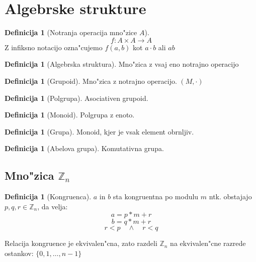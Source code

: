 \documentclass[11pt, a4paper]{article}
\theoremstyle{definition}
\newtheorem{defn}[counter]{Definicija}
\theoremstyle{remark}
\newcommand{\Z}{\mathbb{Z}}
\begin{document}
	\section{Algebrske strukture}
	\begin{defn}[Notranja operacija mno"zice $A$]
		\[ f: A \times A \rightarrow A\]
		Z infiksno notacijo ozna"cujemo $f(a,b)$ kot $a \cdot b$ ali $ab$
	\end{defn}
	\begin{defn}[Algebrska struktura]
		Mno"zica z vsaj eno notrajno operacijo
	\end{defn}
	\begin{defn}[Grupoid]
		Mno"zica z notrajno operacijo. $(M, \cdot)$
	\end{defn}
	\begin{defn}[Polgrupa]
		Asociativen grupoid.
	\end{defn}
	\begin{defn}[Monoid]
		Polgrupa z enoto.
	\end{defn}
	\begin{defn}[Grupa]
		Monoid, kjer je vsak element obrnljiv.
	\end{defn}
	\begin{defn}[Abelova grupa]
		Komutativna grupa.
	\end{defn}

	\begin{comment}
	\begin{defn}[Kolobar]
		Mno"zica z 2 operacijama $(M, +, \cdot)$ \\
		kjer je $(M, +)$ abelova grupa in $(M, \cdot)$ monoid.
	\end{defn}
	\begin{defn}[Obseg]
		Kolobar, kjer so neni"celni elementi grupa za $\cdot$
	\end{defn}
	\begin{defn}[Polje]
		Komutativni obseg
	\end{defn}
	\begin{defn}[Modul]
		Kolobar z abelovo grupo $((M, +, \cdot), (V, \oplus))$
	\end{defn}
	\begin{defn}[Vektorski prostor]
		Modul, kjer je $(M, +, \cdot)$ polje.
	\end{defn}
	\end{comment}
	
	\subsection{Mno"zica $\Z_n$}
	\begin{defn}[Kongruenca]
			$a$ in $b$ sta kongruentna po modulu $m$ ntk. obstajajo $p,q,r \in \Z_n$, da velja:
			\[ a = p*m + r \]
			\[ b = q*m + r \]
			\[ r < p \quad \land \quad r < q \]
	\end{defn}
	Relacija kongruence je ekvivalen"cna, zato razdeli $\Z_n$ na ekvivalen"cne razrede ostankov: $\lbrace 0, 1, \ldots, n-1 \rbrace$
	
\end{document}
